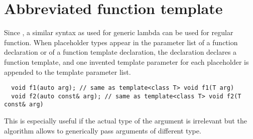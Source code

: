 \section{Abbreviated function template}
Since \marginpar{[\cxx{20}]}, a similar syntax as used for generic lambda can be used for regular function. When placeholder types  appear in the
parameter list of a function declaration or of a function template declaration, the declaration declares a function template, and one
invented template parameter for each placeholder is appended to the template parameter list.
%
\begin{verbatim}
  void f1(auto arg); // same as template<class T> void f1(T arg)
  void f2(auto const& arg); // same as template<class T> void f2(T const& arg)
\end{verbatim}
%
This is especially useful if the actual type of the argument is irrelevant but the algorithm allows to generically pass arguments of different
type.
